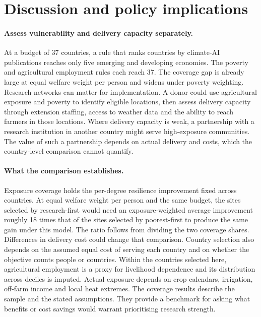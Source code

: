 \section{Discussion and policy implications}\label{sec:discussion}

\paragraph{Assess vulnerability and delivery capacity separately.}
At a budget of 37 countries, a rule that ranks countries by climate-AI publications reaches
only five emerging and developing economies. The poverty and agricultural employment rules
each reach 37. The coverage gap is already large at equal welfare weight per person and
widens under poverty weighting. Research networks can matter for implementation. A donor
could use agricultural exposure and poverty to identify eligible locations, then assess
delivery capacity through extension staffing, access to weather data and the ability to
reach farmers in those locations. Where delivery capacity is weak, a partnership with a
research institution in another country might serve high-exposure communities. The value of
such a partnership depends on actual delivery and costs, which the country-level comparison
cannot quantify.

\paragraph{What the comparison establishes.}
Exposure coverage holds the per-degree resilience improvement fixed across countries.
At equal welfare weight per person and the same budget, the sites selected by
research-first would need an exposure-weighted average improvement roughly 18 times
that of the sites selected by poorest-first to produce the same gain under this model.
The ratio follows from dividing the two coverage shares. Differences in delivery cost
could change that comparison. Country selection also depends on the assumed equal cost of
serving each country and on whether the objective counts people or countries. Within the
countries selected here, agricultural employment is a proxy for livelihood dependence and its
distribution across deciles is imputed. Actual exposure depends on crop calendars, irrigation,
off-farm income and local heat extremes. The coverage results describe the sample and the
stated assumptions. They provide a benchmark for asking what benefits or cost savings
would warrant prioritising research strength.

